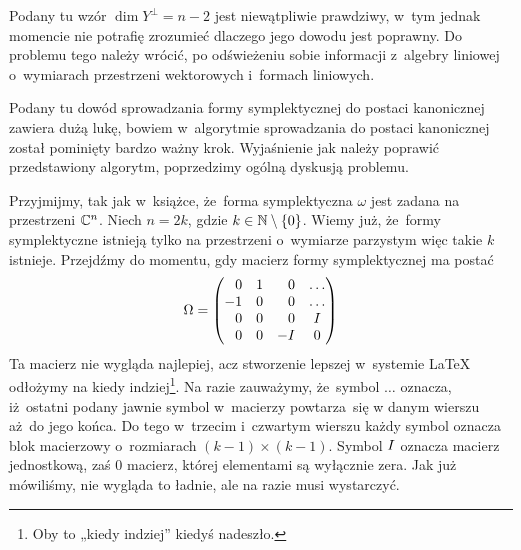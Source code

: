 \documentclass[a4paper,11pt]{article}
\numberwithin{equation}{section}
\begin{document}
\VerSpaceFour





\noindent
{} Podany tu wzór $\dim Y^{ \perp } = n - 2$ jest niewątpliwie
prawdziwy, w~tym jednak momencie nie potrafię zrozumieć dlaczego jego
dowodu jest poprawny. Do problemu tego należy wrócić, po odświeżeniu sobie
informacji z~algebry liniowej o~wymiarach przestrzeni wektorowych i~formach
liniowych.

\VerSpaceFour





\noindent
{} Podany tu dowód sprowadzania formy symplektycznej do
postaci kanonicznej zawiera dużą lukę, bowiem w~algorytmie sprowadzania do
postaci kanonicznej został pominięty bardzo ważny krok. Wyjaśnienie jak
należy poprawić przedstawiony algorytm, poprzedzimy ogólną dyskusją
problemu.

Przyjmijmy, tak jak w~książce, że~forma symplektyczna $\omega$ jest zadana na
przestrzeni $\mathbb{C}^{ n }$. Niech $n = 2k$, gdzie $k \in \mathbb{N} \setminus \{ 0 \}$. Wiemy
już, że~formy symplektyczne istnieją tylko na przestrzeni o~wymiarze
parzystym więc takie $k$ istnieje. Przejdźmy do momentu, gdy macierz formy symplektycznej ma postać
\begin{equation}
  \label{eq:Wojtynski-13}
  \Omega =
  \begin{pmatrix}
    \hphantom{-} 0 & 1 & \hphantom{-} 0 & \ldots \\
    -1 & 0 & \hphantom{-} 0 & \ldots \\
    \hphantom{-} 0 & 0 & \hphantom{-} 0 & I \\
    \hphantom{-} 0 & 0 & -I & 0 \\
  \end{pmatrix}
\end{equation}
Ta macierz nie wygląda najlepiej, acz stworzenie lepszej w~systemie \LaTeX{}
odłożymy na kiedy indziej\footnote{Oby to „kiedy indziej” kiedyś nadeszło.}.
Na razie zauważymy, że~symbol $\ldots$ oznacza, iż~ostatni podany jawnie symbol
w~macierzy powtarza~się w danym wierszu aż~do jego końca. Do tego w~trzecim
i~czwartym wierszu każdy symbol oznacza blok macierzowy o~rozmiarach
$( k - 1 ) \times ( k - 1 )$. Symbol $I$ oznacza macierz jednostkową, zaś
$0$ macierz, której elementami są wyłącznie zera. Jak już mówiliśmy, nie
wygląda to ładnie, ale na razie musi wystarczyć.
\end{document}
